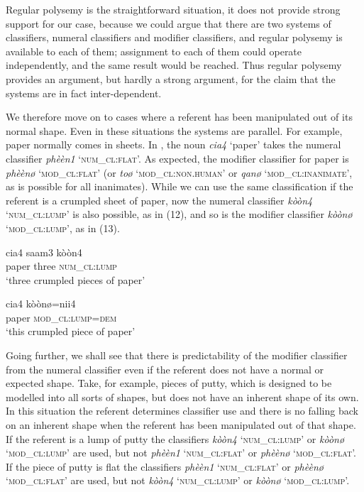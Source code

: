 \documentclass[output=paper]{langsci/langscibook}
\begin{document}
 Regular polysemy is the straightforward situation, it does not provide strong support for our case, because we could argue that there are two systems of classifiers, numeral classifiers and modifier classifiers, and regular polysemy is available to each of them; assignment to each of them could operate independently, and the same result would be reached. Thus regular polysemy provides an argument, but hardly a strong argument, for the claim that the systems are in fact inter-dependent. 

We therefore move on to cases where a referent has been manipulated out of its normal shape. Even in these situations the systems are parallel. For example, paper normally comes in sheets. In , the noun \textit{cia4} ‘paper’ takes the numeral classifier \textit{phèèn1} ‘\textsc{num\_cl}:\textsc{flat}’. As expected, the modifier classifier for paper is \textit{phèènø} ‘\textsc{mod\_cl}:\textsc{flat}’ (or \textit{toø} ‘\textsc{mod\_cl}:\textsc{non.human}’ or \textit{qanø} ‘\textsc{mod\_cl}:\textsc{inanimate}’, as is possible for all inanimates). While we can use the same classification if the referent is a crumpled sheet of paper, now the numeral classifier \textit{kòòn4} ‘\textsc{num\_cl}:\textsc{lump}’ is also possible, as in (12), and so is the modifier classifier \textit{kòònø} ‘\textsc{mod\_cl}:\textsc{lump}’, as in (13). 

\ea%
    \label{ex:fc:12}
    \gll  cia4     saam3   kòòn4\\
    paper    three    \textsc{num\_cl}:\textsc{lump}	\\
    \glt    ‘three crumpled pieces of paper’
    \z


\ea%
    \label{ex:fc:13}
    \gll	  cia4     kòònø=nii4\\
    paper    \textsc{mod\_cl}:\textsc{lump}=\textsc{dem}	\\
    \glt ‘this crumpled piece of paper’
    \z

  Going further, we shall see that there is predictability of the modifier classifier from the numeral classifier even if the referent does not have a normal or expected shape. Take, for example, pieces of putty, which is designed to be modelled into all sorts of shapes, but does not have an inherent shape of its own. In this situation the referent determines classifier use and there is no falling back on an inherent shape when the referent has been manipulated out of that shape. If the referent is a lump of putty the classifiers \textit{kòòn4} ‘\textsc{num\_cl}:\textsc{lump}’ or \textit{kòònø} ‘\textsc{mod\_cl}:\textsc{lump}’ are used, but not \textit{phèèn1} ‘\textsc{num\_cl}:\textsc{flat}’ or \textit{phèènø} ‘\textsc{mod\_cl}:\textsc{flat}’. If the piece of putty is flat the classifiers \textit{phèèn1} ‘\textsc{num\_cl}:\textsc{flat}’ or \textit{phèènø} ‘\textsc{mod\_cl}:\textsc{flat}’ are used, but not \textit{kòòn4} ‘\textsc{num\_cl}:\textsc{lump}’ or \textit{kòònø} ‘\textsc{mod\_cl}:\textsc{lump}’.
\end{document}
